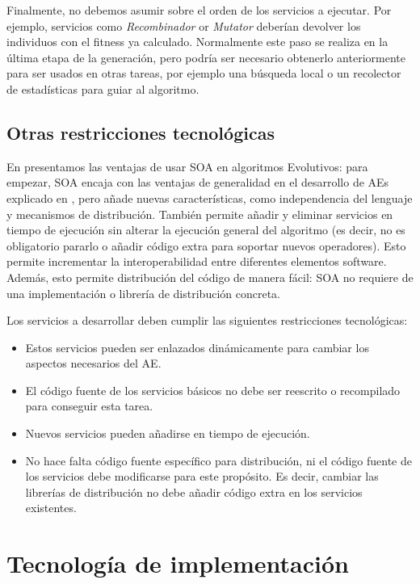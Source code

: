 \documentclass[runningheads]{llncs}
\begin{document}
Finalmente, no debemos asumir sobre el orden de los servicios a ejecutar. Por ejemplo, servicios como {\em Recombinador} or {\em Mutator} deberían devolver los individuos con el fitness ya calculado. Normalmente este paso se realiza en la última etapa de la generación, pero podría ser necesario obtenerlo anteriormente para ser usados en otras tareas, por ejemplo una búsqueda local o un recolector de estadísticas para guiar al algoritmo.

\subsection{Otras restricciones tecnológicas}

En \cite{OSGILIATH} presentamos las ventajas de usar SOA en algoritmos Evolutivos: para empezar, SOA encaja con las ventajas de generalidad en el desarrollo de AEs explicado en \cite{GENERICITY05}, pero añade nuevas características, como independencia del lenguaje y mecanismos de distribución. También permite añadir y eliminar servicios en tiempo de ejecución sin alterar la ejecución general del algoritmo (es decir, no es obligatorio pararlo o añadir código extra para soportar nuevos operadores). Esto permite incrementar la interoperabilidad entre diferentes elementos software. Además, esto permite distribución del código de manera fácil: SOA no requiere de una implementación o librería de distribución concreta.

Los servicios a desarrollar deben cumplir las siguientes restricciones tecnológicas:
\begin{itemize}
\item Estos servicios pueden ser enlazados dinámicamente para cambiar los aspectos necesarios del AE.
\item El código fuente de los servicios básicos no debe ser reescrito o recompilado para conseguir esta tarea.
\item Nuevos servicios pueden añadirse en tiempo de ejecución.
\item No hace falta código fuente específico para distribución, ni el código fuente de los servicios debe modificarse para este propósito. Es decir, cambiar las librerías de distribución no debe añadir código extra en los servicios existentes.
\end{itemize}

\section{Tecnología de implementación}
\label{sec:technology}
\end{document}
